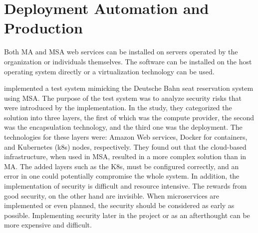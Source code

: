 
\section{Deployment Automation and Production}
\begin{sloppypar}
    Both MA and MSA web services can be installed on servers operated by the
    organization or individuals themselves. The software can be installed on the
    host operating system directly or a virtualization technology can be used.
\end{sloppypar}
\begin{sloppypar}
    \citet{closer18} implemented a test system mimicking the Deutsche Bahn seat
    reservation system using MSA. The purpose of the test system was to analyze
    security risks that were introduced by the implementation. In the study,
    they categorized the solution into three layers, the first of which was the
    compute provider, the second was the encapsulation technology, and the third
    one was the deployment. The technologies for these layers were: Amazon Web
    services, Docker for containers, and Kubernetes (k8s) nodes, respectively.
    They found out that the cloud-based infrastructure, when used in MSA,
    resulted in a more complex solution than in MA. The added layers such as the
    K8s, must be configured correctly, and an error in one could potentially
    compromise the whole system. In addition, the implementation of security is
    difficult and resource intensive. The rewards from good security, on the
    other hand are invisible. When microservices are implemented or even
    planned, the security should be considered as early as possible.
    Implementing security later in the project or as an afterthought can be more
    expensive and difficult.
\end{sloppypar}

